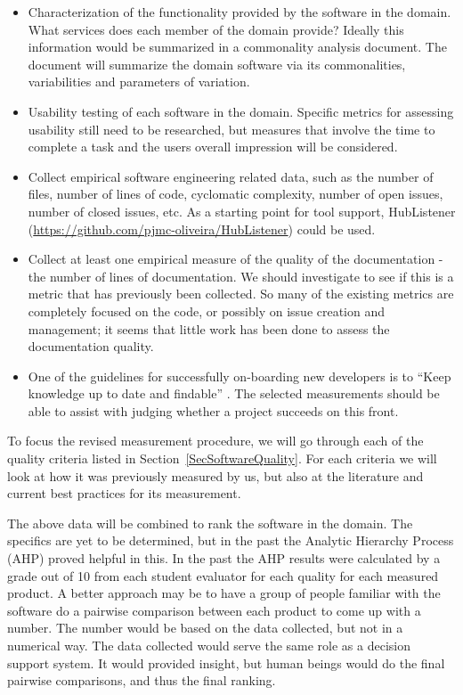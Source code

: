 \documentclass[12pt]{article}
\begin{document}
\begin{itemize}
\item Characterization of the functionality provided by the software in the
  domain.  What services does each member of the domain provide?  Ideally this
  information would be summarized in a commonality analysis document.  The
  document will summarize the domain software via its commonalities,
  variabilities and parameters of variation.
\item Usability testing of each software in the domain.  Specific metrics for
  assessing usability still need to be researched, but measures that involve the
  time to complete a task and the users overall impression will be considered.
\item Collect empirical software engineering related data, such as the number of
  files, number of lines of code, cyclomatic complexity, number of open issues,
  number of closed issues, etc.  As a starting point for tool support,
  HubListener (\url{https://github.com/pjmc-oliveira/HubListener}) could be
  used.
\item Collect at least one empirical measure of the quality of the documentation
  - the number of lines of documentation.  We should investigate to see if this
  is a metric that has previously been collected.  So many of the existing
  metrics are completely focused on the code, or possibly on issue creation and
  management; it seems that little work has been done to assess the
  documentation quality.
\item One of the guidelines for successfully on-boarding new developers is to
  ``Keep knowledge up to date and findable'' \citep{ShollerEtAl2019}.  The
  selected measurements should be able to assist with judging whether a project
  succeeds on this front.
\end{itemize}

To focus the revised measurement procedure, we will go through each of the
quality criteria listed in Section~\ref{SecSoftwareQuality}.  For each criteria
we will look at how it was previously measured by us, but also at the literature
and current best practices for its measurement.

The above data will be combined to rank the software in the domain.  The
specifics are yet to be determined, but in the past the Analytic Hierarchy
Process (AHP) \citep{Saaty1980} proved helpful in this.  In the past the AHP
results were calculated by a grade out of 10 from each student evaluator for
each quality for each measured product.  A better approach may be to have a
group of people familiar with the software do a pairwise comparison between each
product to come up with a number.  The number would be based on the data
collected, but not in a numerical way.  The data collected would serve the same
role as a decision support system.  It would provided insight, but human beings
would do the final pairwise comparisons, and thus the final ranking.
\end{document}
